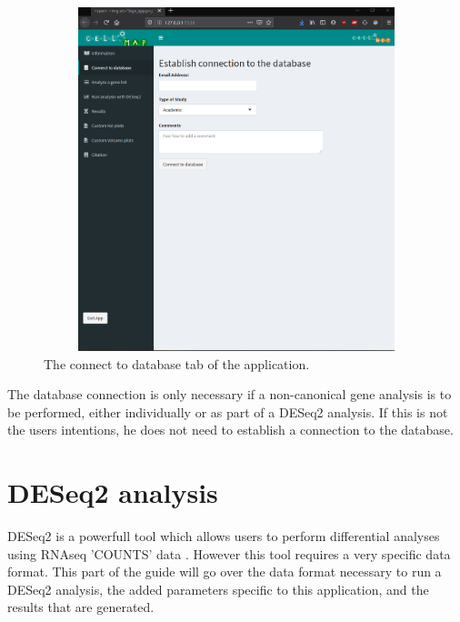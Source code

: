 \documentclass[11pt]{article}
\begin{document}
\begin{figure}[h!]
\centering
\includegraphics[width=15cm,height=10cm,keepaspectratio]{connect_DB.png}
\caption{The connect to database tab of the application.}
\label{fig:connect_DB}
\end{figure}

The database connection is only necessary if a non-canonical gene analysis is to be performed, either individually or as part of a DESeq2 analysis. If this is not the users intentions, he does not need to establish a connection to the database.

\section{DESeq2 analysis}
DESeq2 is a powerfull tool which allows users to perform differential analyses using RNAseq 'COUNTS' data \cite{love2014moderated}. However this tool requires a very specific data format. This part of the guide will go over the data format necessary to run a DESeq2 analysis, the added parameters specific to this application, and the results that are generated.
\end{document}
